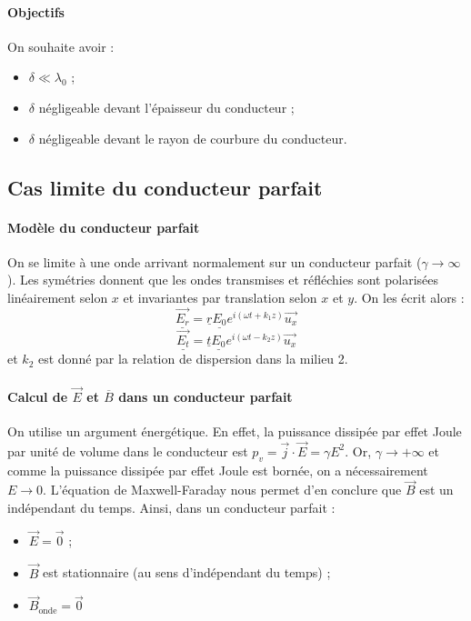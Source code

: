 \documentclass[french]{book}
\theoremstyle{plain}
\theoremstyle{definition}
\theoremstyle{remark}
\begin{document}
\paragraph{Objectifs} On souhaite avoir : 
\begin{itemize}
	\item $\delta\ll\lambda_0$ ;
	\item $\delta$ négligeable devant l'épaisseur du conducteur ;
	\item $\delta$ négligeable devant le rayon de courbure du conducteur.
\end{itemize}
\subsection{Cas limite du conducteur parfait}
\paragraph{Modèle du conducteur parfait} On se limite à une onde arrivant normalement sur un conducteur parfait ($\gamma\to\infty$). Les symétries donnent que les ondes transmises et réfléchies sont polarisées linéairement selon $x$ et invariantes par translation selon $x$ et $y$. On les écrit alors : $$\underline{\overrightarrow{E_r}}=\underline{r}\underline{E_0}e^{i(\omega t+k_1z)}\overrightarrow{u_x}$$ $$\underline{\overrightarrow{E_t}}=\underline{t}\underline{E_0}e^{i(\omega t-k_2z)}\overrightarrow{u_x}$$ et $k_2$ est donné par la relation de dispersion dans la milieu 2.
\paragraph{Calcul de $\overrightarrow{E}$ et $\overline{B}$ dans un conducteur parfait} On utilise un argument énergétique. En effet, la puissance dissipée par effet Joule par unité de volume dans le conducteur est $p_v=\overrightarrow{j}\cdot\overrightarrow{E}=\gamma E^2$. Or, $\gamma\to +\infty$ et comme la puissance dissipée par effet Joule est bornée, on a nécessairement $E\to0$. L'équation de Maxwell-Faraday nous permet d'en conclure que $\overrightarrow{B}$ est un indépendant du temps. Ainsi, dans un conducteur parfait :
\begin{itemize}
	\item $\overrightarrow{E}=\overrightarrow{0}$ ;
	\item $\overrightarrow{B}$ est stationnaire (au sens d'indépendant du temps) ;
	\item $\overrightarrow{B}_\text{onde}=\overrightarrow{0}$
\end{itemize}
\end{document}
